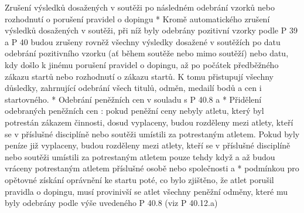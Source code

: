 Zrušení výsledků dosažených v soutěži po následném odebrání vzorků nebo rozhodnutí o porušení pravidel o dopingu
* Kromě automatického zrušení výsledků dosažených v soutěži, při níž byly odebrány pozitivní vzorky podle P 39 a P 40 budou zrušeny rovněž všechny výsledky dosažené v soutěžích po datu odebrání pozitivního vzorku (ať během soutěže nebo mimo soutěží) nebo datu, kdy došlo k jinému porušení pravidel o dopingu, až po počátek předběžného zákazu startů nebo rozhodnutí o zákazu startů. K tomu přistupují všechny důsledky,  zahrnující odebrání všech titulů, odměn, medailí bodů a cen i startovného.
* Odebrání peněžních cen v souladu s P 40.8
  \begitems \style a
  * Přidělení odebraných peněžních cen : pokud peněžní ceny nebyly atletu, který byl potrestán zákazem činnosti, dosud vyplaceny, budou rozděleny mezi atlety, kteří se v příslušné disciplíně nebo soutěži umístili za potrestaným atletem. Pokud byly peníze již vyplaceny, budou rozděleny mezi atlety, kteří se v příslušné disciplíně nebo soutěži umístili za potrestaným atletem pouze tehdy když a až budou vráceny potrestaným atletem příslušné osobě nebo společnosti a
  * podmínkou pro opětovné získání oprávnění ke startu poté, co bylo zjištěno, že atlet porušil pravidla o dopingu, musí provinivší se atlet všechny peněžní odměny, které mu byly odebrány podle výše uvedeného P 40.8 (viz P 40.12.a)
  \enditems

